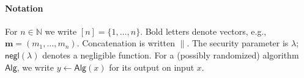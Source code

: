 







\paragraph{Notation}
For $n \in \mathbb{N}$ we write $[n]=\{1,\ldots,n\}$. Bold letters denote vectors, e.g., $\mathbf{m}=(m_1,\ldots,m_n)$. Concatenation is written $\|$. The security parameter is $\lambda$; $\mathsf{negl}(\lambda)$ denotes a negligible function. For a (possibly randomized) algorithm $\mathsf{Alg}$, we write $y \leftarrow \mathsf{Alg}(x)$ for its output on input $x$.

